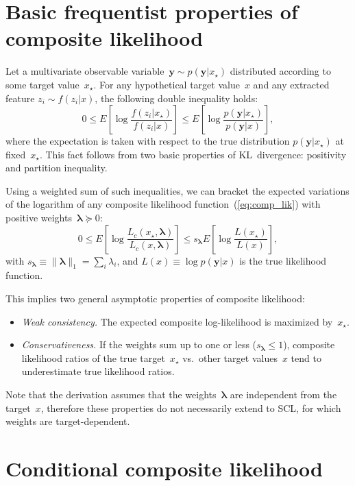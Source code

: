 \documentclass[english]{scrartcl}
\def\y{{\mathbf{y}}}
\newcommand{\blambda}{{\boldsymbol{\lambda}}}
\begin{document}
\appendix


\section{Basic frequentist properties of composite likelihood}
\label{app:frequentist}

Let a multivariate observable variable~$\y \sim p(\y|x_\star)$ distributed according to some target value~$x_\star$. For any hypothetical target value~$x$ and any extracted feature $z_i\sim f(z_i|x)$, the following double inequality holds:
$$
0 \leq
E\left[
\log \frac{f(z_i|x_\star)}{f(z_i|x)}
\right]
\leq
E\left[
\log \frac{p(\y|x_\star)}{p(\y|x)}
\right],
$$
where the expectation is taken with respect to the true distribution $p(\y|x_\star)$ at fixed~$x_\star$. This fact follows from two basic properties of KL~divergence: positivity and partition inequality.

Using a weighted sum of such inequalities, we can bracket the expected variations of the logarithm of any composite likelihood function~(\ref{eq:comp_lik}) with positive weights~$\blambda\succeq 0$:
\begin{equation}
\label{eq:variation_bound}
0 \leq
E\left[ \log \frac{L_c(x_\star, \blambda)}{L_c(x,\blambda)} \right]
\leq 
s_\blambda E\left[ \log \frac{L(x_\star)}{L(x)} \right]
,
\end{equation}
with $s_\blambda\equiv \|\blambda\|_1 =\sum_i \lambda_i$, and $L(x)\equiv \log p(\y|x)$ is the true likelihood function.

This implies two general asymptotic properties of composite likelihood:
\begin{itemize}
\item {\em Weak consistency.} The expected composite log-likelihood is maximized by~$x_\star$.
\item {\em Conservativeness.} If the weights sum up to one or less ($s_\blambda\leq 1$), composite likelihood ratios of the true target~$x_\star$ vs.~other target values~$x$ tend to  underestimate true likelihood ratios.
\end{itemize}

Note that the derivation assumes that the weights~$\blambda$ are independent from the target~$x$, therefore these properties do not necessarily extend to SCL, for which weights are target-dependent.


\section{Conditional composite likelihood}
\label{app:conditional}
\end{document}
